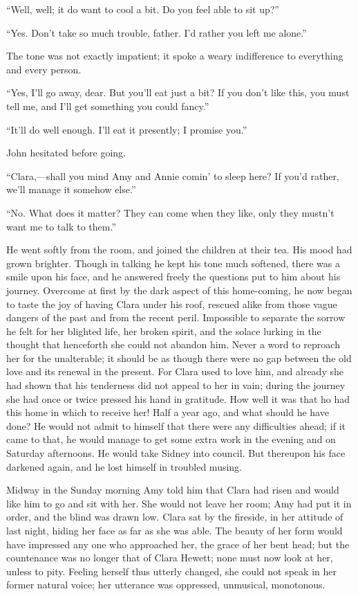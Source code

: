 ``Well, well; it do want to cool a bit. Do you feel able to sit up?''

``Yes. Don't take so much trouble, father. I'd rather you left me
alone.''

The tone was not exactly impatient; it spoke a weary indifference to
everything and every person.

``Yes, I'll go away, dear. But you'll eat just a bit? If you don't like
this, you must tell me, and I'll get something you could fancy.''

``It'll do well enough. I'll eat it presently; I promise you.''

John hesitated before going.

``Clara,---shall you mind Amy and Annie comin' to sleep here? If you'd
rather, we'll manage it somehow else.''

``No. What does it matter? They can {\protect\hypertarget{300}{}{}}come
when they like, only they mustn't want me to talk to them.''

He went softly from the room, and joined the children at their tea. His
mood had grown brighter. Though in talking he kept his tone much
softened, there was a smile upon his face, and he answered freely the
questions put to him about his journey. Overcome at first by the dark
aspect of this home-coming, he now began to taste the joy of having
Clara under his roof, rescued alike from those vague dangers of the past
and from the recent peril. Impossible to separate the sorrow he felt for
her blighted life, her broken spirit, and the solace lurking in the
thought that henceforth she could not abandon him. Never a word to
reproach her for the unalterable; it should be as though there were no
gap between the old love and its renewal in the present. For Clara used
to love him, and already she had shown that his tenderness did not
appeal to her in vain; during the journey she had once or twice pressed
his hand in gratitude. How well it {\protect\hypertarget{301}{}{}}was
that ho had this home in which to receive her! Half a year ago, and what
should he have done? He would not admit to himself that there were any
difficulties ahead; if it came to that, he would manage to get some
extra work in the evening and on Saturday afternoons. He would take
Sidney into council. But thereupon his face darkened again, and he lost
himself in troubled musing.

Midway in the Sunday morning Amy told him that Clara had risen and would
like him to go and sit with her. She would not leave her room; Amy had
put it in order, and the blind was drawn low. Clara sat by the fireside,
in her attitude of last night, hiding her face as far as she was able.
The beauty of her form would have impressed any one who approached her,
the grace of her bent head; but the countenance was no longer that of
Clara Hewett; none must now look at her, unless to pity. Feeling herself
thus utterly changed, she could not speak in her former natural voice;
her utterance was oppressed, unmusical, monotonous.

